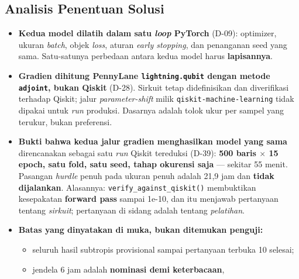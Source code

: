 \subsection{Analisis Penentuan Solusi}

\begin{itemize}
    \item \textbf{Kedua model dilatih dalam satu \textit{loop} PyTorch}
          (D-09): optimizer, ukuran \textit{batch}, objek \textit{loss}, aturan
          \textit{early stopping}, dan penanganan seed yang sama. Satu-satunya
          perbedaan antara kedua model harus \textbf{lapisannya}.
    \item \textbf{Gradien dihitung PennyLane \texttt{lightning.qubit} dengan
          metode \texttt{adjoint}, bukan Qiskit} (D-28). Sirkuit tetap
          didefinisikan dan diverifikasi terhadap Qiskit; jalur
          \textit{parameter-shift} milik \texttt{qiskit-machine-learning} tidak
          dipakai untuk \textit{run} produksi. Dasarnya adalah tolok ukur per
          sampel yang terukur, bukan preferensi.
    \item \textbf{Bukti bahwa kedua jalur gradien menghasilkan model yang sama}
          direncanakan sebagai satu \textit{run} Qiskit tereduksi (D-39):
          \textbf{500 baris $\times$ 15 epoch, satu fold, satu seed, tahap
          okurensi saja} --- sekitar 55 menit. Pasangan \textit{hurdle} penuh
          pada ukuran penuh adalah 21,9 jam dan \textbf{tidak dijalankan}.
          Alasannya: \texttt{verify\_against\_qiskit()} membuktikan kesepakatan
          \textbf{forward pass} sampai 1e-10, dan itu menjawab pertanyaan
          tentang \textit{sirkuit}; pertanyaan di sidang adalah tentang
          \textit{pelatihan}.
    \item \textbf{Batas yang dinyatakan di muka, bukan ditemukan penguji:}
          \begin{itemize}
              \item seluruh hasil subtropis provisional sampai pertanyaan
                    terbuka 10 selesai;
              \item jendela 6 jam adalah \textbf{nominasi demi keterbacaan},

\end{itemize}
\end{itemize}
